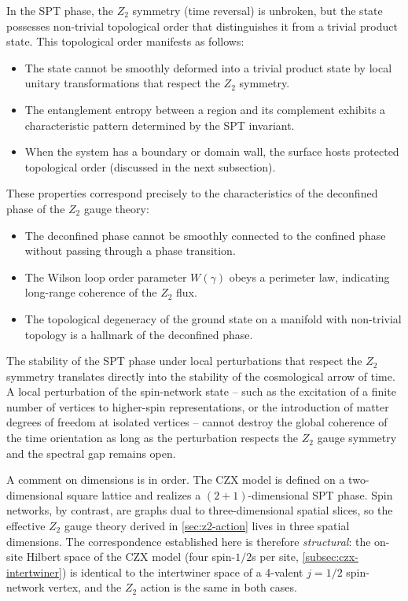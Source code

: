 In the SPT phase, the $ Z_2 $ symmetry (time reversal) is unbroken, but the state possesses non-trivial topological order that distinguishes it from a trivial product state. This topological order manifests as follows:
\begin{itemize}
	\item The state cannot be smoothly deformed into a trivial product state by local unitary transformations that respect the $ Z_2 $ symmetry.
	\item The entanglement entropy between a region and its complement exhibits a characteristic pattern determined by the SPT invariant.
	\item When the system has a boundary or domain wall, the surface hosts protected topological order (discussed in the next subsection).
\end{itemize}

These properties correspond precisely to the characteristics of the deconfined phase of the $ Z_2 $ gauge theory:
\begin{itemize}
	\item The deconfined phase cannot be smoothly connected to the confined phase without passing through a phase transition.
	\item The Wilson loop order parameter $ W(\gamma) $ obeys a perimeter law, indicating long-range coherence of the $ Z_2 $ flux.
	\item The topological degeneracy of the ground state on a manifold with non-trivial topology is a hallmark of the deconfined phase.
\end{itemize}

The stability of the SPT phase under local perturbations that respect the $ Z_2 $ symmetry translates directly into the stability of the cosmological arrow of time. A local perturbation of the spin-network state -- such as the excitation of a finite number of vertices to higher-spin representations, or the introduction of matter degrees of freedom at isolated vertices -- cannot destroy the global coherence of the time orientation as long as the perturbation respects the $ Z_2 $ gauge symmetry and the spectral gap remains open.

A comment on dimensions is in order. The CZX model is defined on a two-dimensional square lattice and realizes a $ (2+1) $-dimensional SPT phase. Spin networks, by contrast, are graphs dual to three-dimensional spatial slices, so the effective $ Z_2 $ gauge theory derived in \autoref{sec:z2-action} lives in three spatial dimensions. The correspondence established here is therefore \emph{structural}: the on-site Hilbert space of the CZX model (four spin-$ 1/2 $s per site, \autoref{subsec:czx-intertwiner}) is identical to the intertwiner space of a 4-valent $ j = 1/2 $ spin-network vertex, and the $ Z_2 $ action is the same in both cases.

